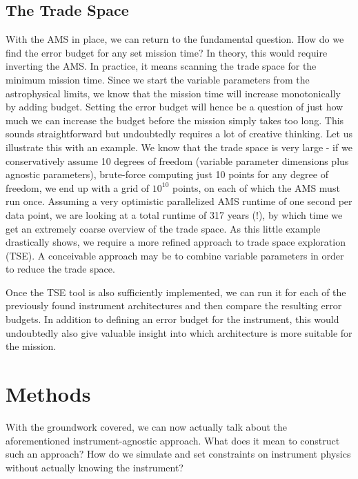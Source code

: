 \documentclass[12pt,a4paper]{article}
\numberwithin{equation}{section}
\numberwithin{figure}{section}
\numberwithin{table}{section}
\begin{document}
\subsection{The Trade Space} \label{sec: intro: trade space}
With the AMS in place, we can return to the fundamental question. How do we find the error budget for any set mission time? In theory, this would require inverting the AMS. In practice, it means scanning the trade space for the minimum mission time. Since we start the variable parameters from the astrophysical limits, we know that the mission time will increase monotonically by adding budget. Setting the error budget will hence be a question of just how much we can increase the budget before the mission simply takes too long. This sounds straightforward but undoubtedly requires a lot of creative thinking. Let us illustrate this with an example. We know that the trade space is very large - if we conservatively assume 10 degrees of freedom (variable parameter dimensions plus agnostic parameters), brute-force computing just 10 points for any degree of freedom, we end up with a grid of $10^{10}$ points, on each of which the AMS must run once. Assuming a very optimistic parallelized AMS runtime of one second per data point, we are looking at a total runtime of 317 years (!), by which time we get an extremely coarse overview of the trade space. As this little example drastically shows, we require a more refined approach to trade space exploration (TSE). A conceivable approach may be to combine variable parameters in order to reduce the trade space.

Once the TSE tool is also sufficiently implemented, we can run it for each of the previously found instrument architectures and then compare the resulting error budgets. In addition to defining an error budget for the instrument, this would undoubtedly also give valuable insight into which architecture is more suitable for the mission.

\newpage
\section{Methods} \label{sec: methods}
With the groundwork covered, we can now actually talk about the aforementioned instrument-agnostic approach. What does it mean to construct such an approach? How do we simulate and set constraints on instrument physics without actually knowing the instrument?
\end{document}
